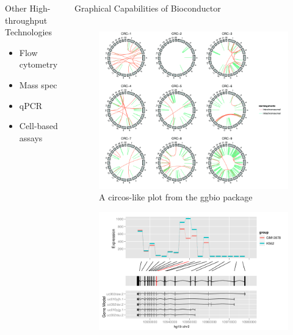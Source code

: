 \documentclass[final]{beamer}
\begin{document}
\begin{frame}[t]
\begin{columns}[t]
\begin{column}{0.24\linewidth}
\begin{block}{Other High-throughput Technologies}
        \begin{itemize}
          \item{Flow cytometry}
          \item{Mass spec}
          \item{qPCR}
          \item{Cell-based assays}
        \end{itemize}
        \end{block}
        \end{column}
    \begin{column}{0.48\linewidth}
      \begin{block}{Graphical Capabilities of Bioconductor}
        \begin{columns}[t]
          \begin{column}{0.33\linewidth}
            \begin{figure}
              \centering
              \includegraphics[width=0.85\linewidth]{cir}
              \caption{A circos-like plot from the ggbio package}
            \end{figure}
            \begin{figure}
              \centering
              \includegraphics[width=0.85\linewidth]{interval}

\end{figure}
\end{column}
\end{columns}
\end{block}
\end{column}
\end{columns}
\end{frame}
\end{document}

